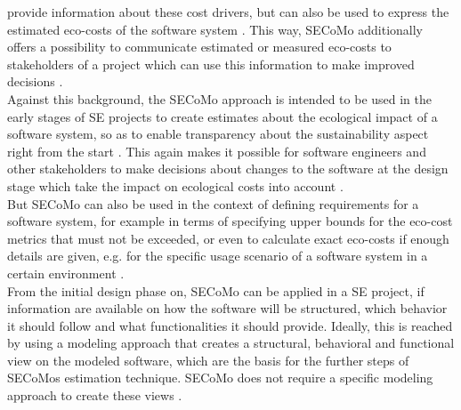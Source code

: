 \documentclass[oribibl]{llncs}
\begin{document}
provide information about these cost drivers, but can also be used to express the estimated eco-costs of the software system \cite{schulze_cost_2016}. This way, SECoMo additionally offers a possibility to communicate estimated or measured eco-costs to stakeholders of a project which can use this information to make improved decisions \cite{schulze_cost_2016}.\\ %
Against this background, the SECoMo approach is intended to be used in the early stages of SE projects to create estimates about the ecological impact of a software system, so as to enable transparency about the sustainability aspect right from the start \cite{schulze_cost_2016}. This again makes it possible for software engineers and other stakeholders to make decisions about changes to the software at the design stage which take the impact on ecological costs into account \cite{schulze_cost_2016}.\\
But SECoMo can also be used in the context of defining requirements for a software system, for example in terms of specifying upper bounds for the eco-cost metrics that must not be exceeded, or even to calculate exact eco-costs if enough details are given, e.g. for the specific usage scenario of a software system in a certain environment %
\cite{schulze_cost_2016}.\\
From the initial design phase on, SECoMo can be applied in a SE project, if information are available on how the software will be structured, which behavior it should follow and what functionalities it should provide. Ideally, this is reached by using a modeling approach that creates a structural, behavioral and functional view on the modeled software, which are the basis for the further steps of SECoMos estimation technique. SECoMo does not require a specific modeling approach to create these views \cite{schulze_cost_2016}.\\
\end{document}
